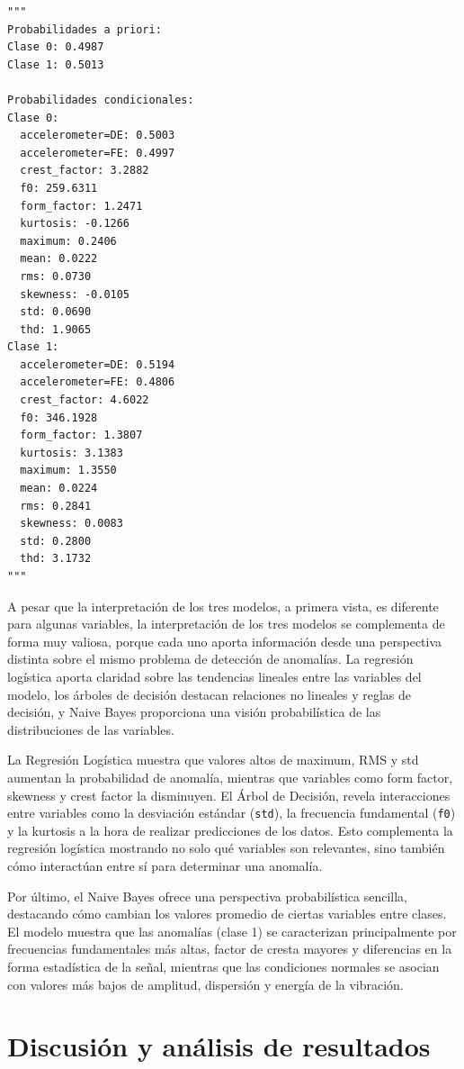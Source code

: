 \documentclass[11pt,a4paper,spanish]{book}
\numberwithin{equation}{chapter}
\numberwithin{figure}{chapter}
\begin{document}
\begin{lstlisting}
"""
Probabilidades a priori:
Clase 0: 0.4987
Clase 1: 0.5013

Probabilidades condicionales:
Clase 0:
  accelerometer=DE: 0.5003
  accelerometer=FE: 0.4997
  crest_factor: 3.2882
  f0: 259.6311
  form_factor: 1.2471
  kurtosis: -0.1266
  maximum: 0.2406
  mean: 0.0222
  rms: 0.0730
  skewness: -0.0105
  std: 0.0690
  thd: 1.9065
Clase 1:
  accelerometer=DE: 0.5194
  accelerometer=FE: 0.4806
  crest_factor: 4.6022
  f0: 346.1928
  form_factor: 1.3807
  kurtosis: 3.1383
  maximum: 1.3550
  mean: 0.0224
  rms: 0.2841
  skewness: 0.0083
  std: 0.2800
  thd: 3.1732
"""
\end{lstlisting}


A pesar que la interpretación de los tres modelos, a primera vista, es diferente para algunas variables, la interpretación de los tres modelos se complementa de forma muy valiosa, porque cada uno aporta información desde una perspectiva distinta sobre el mismo problema de detección de anomalías. La regresión logística aporta claridad sobre las tendencias lineales entre las variables del modelo, los árboles de decisión destacan relaciones no lineales y reglas de decisión, y Naive Bayes proporciona una visión probabilística de las distribuciones de las variables. 


La Regresión Logística muestra que valores altos de maximum, RMS y std aumentan la probabilidad de anomalía, mientras que variables como form factor, skewness y crest factor la disminuyen.  El Árbol de Decisión, revela interacciones entre variables como la desviación estándar (\lstinline|std|), la frecuencia fundamental (\lstinline|f0|) y la kurtosis a la hora de realizar predicciones de los datos. Esto complementa la regresión logística mostrando no solo qué variables son relevantes, sino también cómo interactúan entre sí para determinar una anomalía.


Por último, el Naive Bayes ofrece una perspectiva probabilística sencilla, destacando cómo cambian los valores promedio de ciertas variables entre clases. El modelo muestra que las anomalías (clase 1) se caracterizan principalmente por frecuencias fundamentales más altas, factor de cresta mayores y diferencias en la forma estadística de la señal, mientras que las condiciones normales se asocian con valores más bajos de amplitud, dispersión y energía de la vibración. 






\chapter{Discusión y análisis de resultados}
\end{document}
